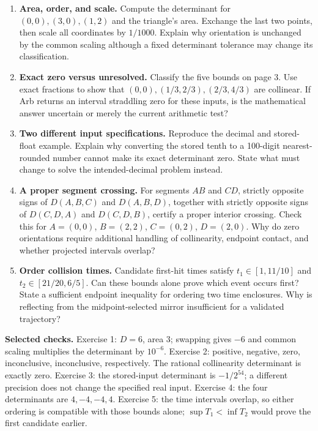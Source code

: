 \newpage
{}
\begin{enumerate}
\item \textbf{Area, order, and scale.} Compute the determinant for
$(0,0),(3,0),(1,2)$ and the triangle's area. Exchange the last two points,
then scale all coordinates by $1/1000$. Explain why orientation is unchanged
by the common scaling although a fixed determinant tolerance may change
its classification.

\item \textbf{Exact zero versus unresolved.} Classify the five bounds
on page 3. Use exact fractions to show that $(0,0),(1/3,2/3),(2/3,4/3)$
are collinear. If Arb returns an interval straddling zero for these inputs,
is the mathematical answer uncertain or merely the current arithmetic test?

\item \textbf{Two different input specifications.} Reproduce the decimal
and stored-float example. Explain why converting the stored tenth to a
100-digit nearest-rounded number cannot make its exact determinant zero.
State what must change to solve the intended-decimal problem instead.

\item \textbf{A proper segment crossing.} For segments $AB$ and $CD$,
strictly opposite signs of $D(A,B,C)$ and $D(A,B,D)$, together with
strictly opposite signs of $D(C,D,A)$ and $D(C,D,B)$, certify a proper
interior crossing. Check this for $A=(0,0)$, $B=(2,2)$, $C=(0,2)$,
$D=(2,0)$. Why do zero orientations require additional handling of
collinearity, endpoint contact, and whether projected intervals overlap?

\item \textbf{Order collision times.} Candidate first-hit times satisfy
$t_1\in[1,11/10]$ and $t_2\in[21/20,6/5]$. Can these bounds alone prove
which event occurs first? State a sufficient endpoint inequality for
ordering two time enclosures. Why is reflecting from the midpoint-selected
mirror insufficient for a validated trajectory?
\end{enumerate}

\textbf{Selected checks.} Exercise 1: $D=6$, area $3$; swapping gives
$-6$ and common scaling multiplies the determinant by $10^{-6}$.
Exercise 2: positive, negative, zero, inconclusive, inconclusive, respectively.
The rational collinearity determinant is exactly zero. Exercise 3: the
stored-input determinant is $-1/2^{54}$; a different precision does not
change the specified real input. Exercise 4: the four determinants are
$4,-4,-4,4$. Exercise 5: the time intervals overlap, so either ordering
is compatible with those bounds alone; $\sup T_1<\inf T_2$ would prove
the first candidate earlier.

